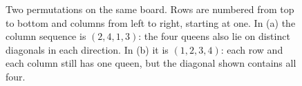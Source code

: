 \begin{figure}[htbp]
\centering
{}
\caption{Two permutations on the same board. Rows are numbered from top to bottom and columns
from left to right, starting at one. In (a) the column sequence is $(2,4,1,3)$: the four
queens also lie on distinct diagonals in each direction. In (b) it is $(1,2,3,4)$:
each row and each column still has one queen, but the diagonal shown contains all four.}
\label{fig:permutaciones}
\end{figure}

